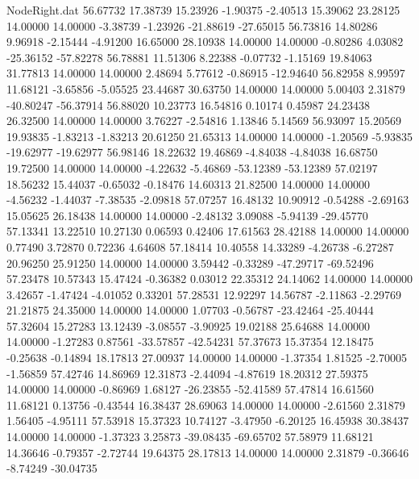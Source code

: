 \begin{filecontents}{NodeRight.dat}
  56.67732   17.38739   15.23926    -1.90375   -2.40513   15.39062   23.28125   14.00000   14.00000   -3.38739   -1.23926  -21.88619  -27.65015
  56.73816   14.80286    9.96918    -2.15444   -4.91200   16.65000   28.10938   14.00000   14.00000   -0.80286    4.03082  -25.36152  -57.82278
  56.78881   11.51306    8.22388    -0.07732   -1.15169   19.84063   31.77813   14.00000   14.00000    2.48694    5.77612   -0.86915  -12.94640
  56.82958    8.99597   11.68121    -3.65856   -5.05525   23.44687   30.63750   14.00000   14.00000    5.00403    2.31879  -40.80247  -56.37914
  56.88020   10.23773   16.54816     0.10174    0.45987   24.23438   26.32500   14.00000   14.00000    3.76227   -2.54816    1.13846    5.14569
  56.93097   15.20569   19.93835    -1.83213   -1.83213   20.61250   21.65313   14.00000   14.00000   -1.20569   -5.93835  -19.62977  -19.62977
  56.98146   18.22632   19.46869    -4.84038   -4.84038   16.68750   19.72500   14.00000   14.00000   -4.22632   -5.46869  -53.12389  -53.12389
  57.02197   18.56232   15.44037    -0.65032   -0.18476   14.60313   21.82500   14.00000   14.00000   -4.56232   -1.44037   -7.38535   -2.09818
  57.07257   16.48132   10.90912    -0.54288   -2.69163   15.05625   26.18438   14.00000   14.00000   -2.48132    3.09088   -5.94139  -29.45770
  57.13341   13.22510   10.27130     0.06593    0.42406   17.61563   28.42188   14.00000   14.00000    0.77490    3.72870    0.72236    4.64608
  57.18414   10.40558   14.33289    -4.26738   -6.27287   20.96250   25.91250   14.00000   14.00000    3.59442   -0.33289  -47.29717  -69.52496
  57.23478   10.57343   15.47424    -0.36382    0.03012   22.35312   24.14062   14.00000   14.00000    3.42657   -1.47424   -4.01052    0.33201
  57.28531   12.92297   14.56787    -2.11863   -2.29769   21.21875   24.35000   14.00000   14.00000    1.07703   -0.56787  -23.42464  -25.40444
  57.32604   15.27283   13.12439    -3.08557   -3.90925   19.02188   25.64688   14.00000   14.00000   -1.27283    0.87561  -33.57857  -42.54231
  57.37673   15.37354   12.18475    -0.25638   -0.14894   18.17813   27.00937   14.00000   14.00000   -1.37354    1.81525   -2.70005   -1.56859
  57.42746   14.86969   12.31873    -2.44094   -4.87619   18.20312   27.59375   14.00000   14.00000   -0.86969    1.68127  -26.23855  -52.41589
  57.47814   16.61560   11.68121     0.13756   -0.43544   16.38437   28.69063   14.00000   14.00000   -2.61560    2.31879    1.56405   -4.95111
  57.53918   15.37323   10.74127    -3.47950   -6.20125   16.45938   30.38437   14.00000   14.00000   -1.37323    3.25873  -39.08435  -69.65702
  57.58979   11.68121   14.36646    -0.79357   -2.72744   19.64375   28.17813   14.00000   14.00000    2.31879   -0.36646   -8.74249  -30.04735

\end{filecontents}
